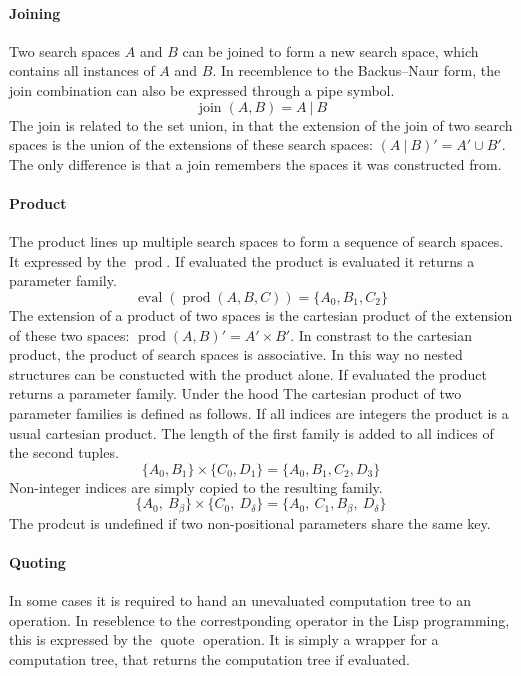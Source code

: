 \documentclass[english]{article}
\begin{document}
\paragraph{Joining}
Two search spaces $A$ and $B$ can be joined to form a new search space, which contains all instances of $A$ and $B$. In recemblence to the Backus–Naur form, the join combination can also be expressed through a pipe symbol.
$$ \operatorname{join}(A, B) = A\ |\ B $$
The join is related to the set union, in that the extension of the join of two search spaces is the union of the extensions of these search spaces: $(A\ |\ B)' = A' \cup B'$. The only difference is that a join remembers the spaces it was constructed from.

\paragraph{Product}
The product lines up multiple search spaces to form a sequence of search spaces. It expressed by the $\operatorname{prod}$. If evaluated the product is evaluated it returns a parameter family.
$$\operatorname{eval}(\operatorname{prod}(A, B, C)) = \{A_0, B_1, C_2\}$$
The extension of a product of two spaces is the cartesian product of the extension of these two spaces: $\operatorname{prod}(A,B)' = A' \times B'$. In constrast to the cartesian product, the product of search spaces is associative.  In this way no nested structures can be constucted with the product alone. If evaluated the product returns a parameter family. Under the hood
The cartesian product of two parameter families is defined as follows. If all indices are integers the product is a usual cartesian product. The length of the first family is added to all indices of the second tuples.
$$\{A_0, B_1\} \times \{C_0, D_1\} = \{A_0, B_1, C_2, D_3\}$$
Non-integer indices are simply copied to the resulting family.
$$\{A_0,\ B_\beta\} \times \{C_0,\ D_\delta\} = \{A_0,\ C_1, B_\beta,\ D_\delta\}$$
The prodcut is undefined if two non-positional parameters share the same key.

\paragraph{Quoting}
In some cases it is required to hand an unevaluated computation tree to an operation. In reseblence to the correstponding operator in the Lisp programming, this is expressed by the $\operatorname{quote}$ operation. It is simply a wrapper for a computation tree, that returns the computation tree if evaluated.
\end{document}

